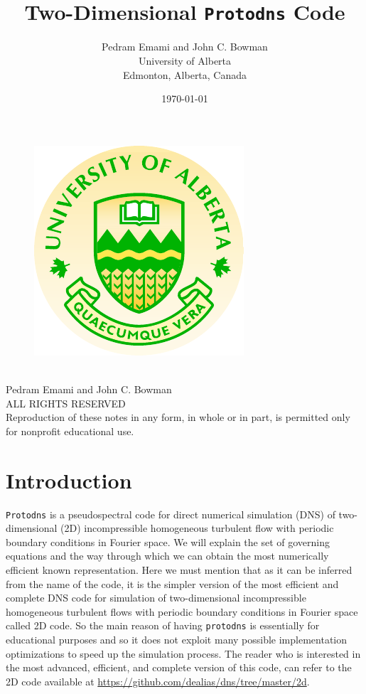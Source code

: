 \documentclass[12pt]{article}
\title{\huge{\textbf{\\Two-Dimensional {\tt Protodns} Code}}}
\author{Pedram Emami and John C. Bowman\\University of Alberta\\Edmonton,
  Alberta, Canada}
\date{\today}
\begin{document}
\maketitle

\thispagestyle{empty}
\begin{figure}[h]
\centering
\includegraphics{uofa}
\end{figure}
\newpage
\thispagestyle{empty}
\begin{center}
\ \vspace{20cm}\\
Pedram Emami and John C. Bowman\\
ALL RIGHTS RESERVED\\
Reproduction of these notes in any form, in whole or in part, is permitted only for nonprofit educational use.
\end{center}
\newpage

\section{Introduction}
{\tt Protodns} is a pseudospectral code for
direct numerical simulation (DNS) of two-dimensional (2D) incompressible homogeneous
  turbulent flow with periodic boundary conditions in Fourier space. We
  will explain the set of governing equations and the way through which we
  can obtain the most numerically efficient known representation.
Here we must mention that as it can be inferred from the name of the code, it is the simpler version of the most efficient and complete DNS code for simulation of two-dimensional incompressible homogeneous turbulent flows with periodic boundary conditions in Fourier space called 2D code. So the main reason of having {\tt protodns} is essentially for educational purposes and so it does not exploit many possible implementation optimizations to speed up the simulation process. The reader who is interested in the most advanced, efficient, and complete version of this code, can refer to the 2D code available at \url{https://github.com/dealias/dns/tree/master/2d}.
%
\end{document}
